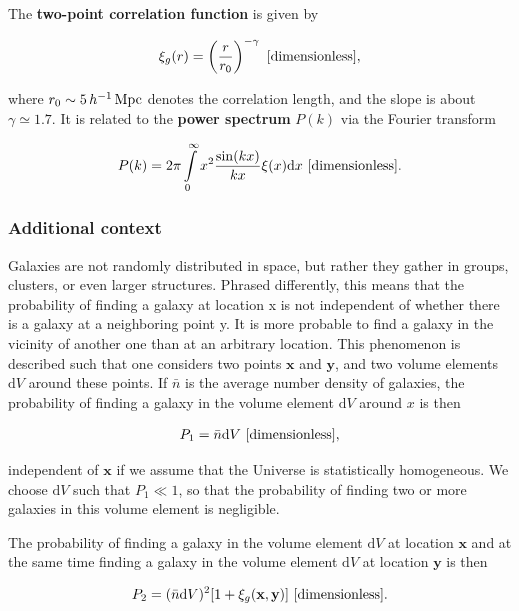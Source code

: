 \documentclass[a4paper,11pt]{article}
\begin{document}
The \textbf{two-point correlation function} is given by

\begin{align*}
    \xi_g(r) = \left(\frac{r}{r_0}\right)^{-\gamma} ~ [{\rm dimensionless}],
\end{align*}

{\noindent}where $r_0\sim5\,h^{-1}\,{\rm Mpc}$ denotes the correlation length, and the slope is about $\gamma\simeq1.7$. It is related to the \textbf{power spectrum} $P(k)$ via the Fourier transform

\begin{align*}
    P(k) = 2\pi \int\limits_0^\infty x^2\frac{\sin(kx)}{kx}\xi(x)\mathrm{d}x ~ [{\rm dimensionless}].
\end{align*}

\subsubsection{Additional context}

Galaxies are not randomly distributed in space, but rather they gather in groups, clusters, or even larger structures. Phrased differently, this means that the probability of finding a galaxy at location x is not independent of whether there is a galaxy at a neighboring point y. It is more probable to find a galaxy in the vicinity of another one than at an arbitrary location. This phenomenon is described such that one considers two points $\mathbf{x}$ and $\mathbf{y}$, and two volume elements $\mathrm{d}V$ around these points. If $\bar{n}$ is the average number density of galaxies, the probability of finding a galaxy in the volume element $\mathrm{d}V$ around $x$ is then

\begin{align*}
    P_1 = \bar{n}\mathrm{d}V ~ [{\rm dimensionless}],
\end{align*}

{\noindent}independent of $\mathbf{x}$ if we assume that the Universe is statistically homogeneous. We choose $\mathrm{d}V$ such that $P_1\ll1$, so that the probability of finding two or more galaxies in this volume element is negligible.

{\noindent}The probability of finding a galaxy in the volume element $\mathrm{d}V$ at location $\mathbf{x}$ and at the same time finding a galaxy in the volume element $\mathrm{d}V$ at location $\mathbf{y}$ is then

\begin{align*}
    P_2 = (\bar{n}\mathrm{d}V)^2 [1+\xi_g(\mathbf{x},\mathbf{y})] ~ [{\rm dimensionless}].
\end{align*}
\end{document}
